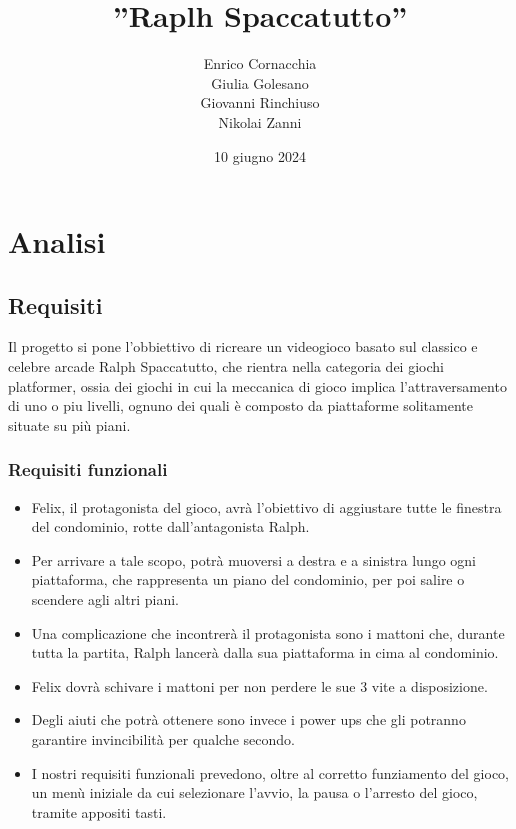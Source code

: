 \title{''Raplh Spaccatutto''}

\author{Enrico Cornacchia \\ Giulia Golesano \\ Giovanni Rinchiuso \\ Nikolai Zanni}
\date{10 giugno 2024}



\maketitle

\tableofcontents

\chapter{Analisi}

\section{Requisiti}

Il progetto si pone l'obbiettivo di ricreare un videogioco basato sul classico e celebre arcade Ralph Spaccatutto, che rientra nella categoria dei giochi platformer, ossia dei giochi in cui la meccanica di gioco implica l'attraversamento di uno o piu livelli, ognuno dei quali è composto da piattaforme solitamente situate su più piani.

\subsection{Requisiti funzionali}

\begin{itemize}

	\item Felix, il protagonista del gioco, avrà l'obiettivo di aggiustare tutte le finestra del condominio, rotte dall'antagonista Ralph. 
	\item Per arrivare a tale scopo, potrà muoversi a destra e a sinistra lungo ogni piattaforma, che rappresenta un piano del condominio, per poi salire o scendere agli altri piani.
	\item Una complicazione che incontrerà il protagonista sono i mattoni che, durante tutta la partita, Ralph lancerà dalla sua piattaforma in cima al condominio.
 \item Felix  dovrà schivare i mattoni per non perdere le sue 3 vite a disposizione.
	\item Degli aiuti che potrà ottenere sono invece i power ups che gli potranno garantire invincibilità per qualche secondo.
	\item I nostri requisiti funzionali prevedono, oltre al corretto funziamento del gioco, un menù iniziale da cui selezionare l'avvio, la pausa o l'arresto del gioco, tramite appositi tasti.
\end{itemize}

